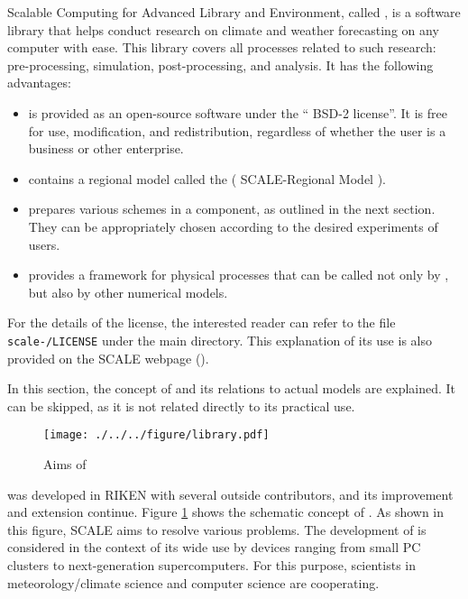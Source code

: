 Scalable Computing for Advanced Library and Environment, called {\scalelib}, is a software library that helps conduct research on climate and weather forecasting on any computer with ease. 
This library covers all processes related to such research: 
pre-processing, simulation, post-processing, and analysis. 
It has the following advantages:
\begin{itemize}
\item 
\scalelib is provided as an open-source software under the `` BSD-2 license''. It is free for use, modification, and redistribution, regardless of whether the user is a business or other enterprise.
\item 
\scalelib contains a regional model called the \scalerm ( SCALE-Regional Model ).
\item 
\scalelib prepares various schemes in a component, as outlined in the next section. They can be appropriately chosen according to the desired experiments of users.
\item 
\scalelib provides a framework for physical processes that can be called not only by \scalerm, but also by other numerical models.
\end{itemize}
For the details of the license, the interested reader can refer to the file \texttt{scale-\version/LICENSE} under the main directory. This explanation of its use is also provided on the SCALE webpage (\scaleweb).

In this section, the concept of \scalelib and its relations to actual models are explained. It can be skipped, as it is not related directly to its practical use.

\clearpage
{}

\begin{figure}[htb]
\begin{center}
  \texttt{[image: ./../../figure/library.pdf]}\\
  \caption{Aims of \scalelib}
  \label{fig:scale}
\end{center}
\end{figure}

\scalelib was developed in RIKEN with several outside contributors,
and its improvement and extension continue.
Figure \ref{fig:scale} shows the schematic concept of \scalelib.
As shown in this figure, SCALE aims to resolve various problems.
The development of \scalelib is considered in the context of its wide use
by devices ranging from small PC clusters to next-generation supercomputers.
For this purpose, scientists in meteorology/climate science
and computer science are cooperating.


